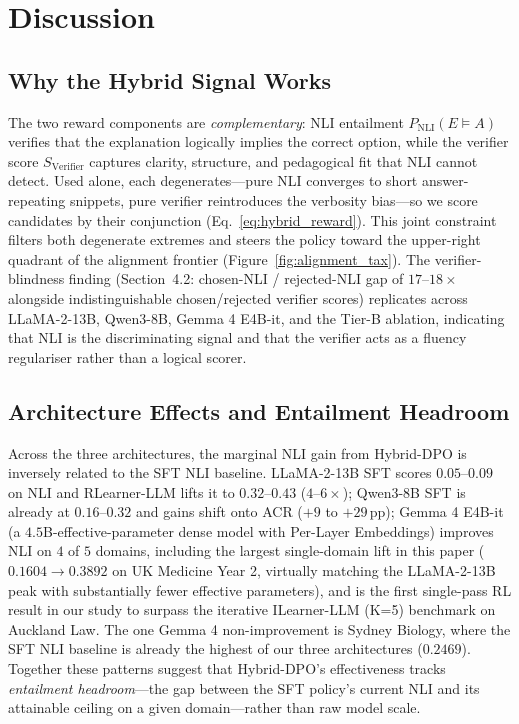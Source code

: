 \section{Discussion}

\subsection{Why the Hybrid Signal Works}
The two reward components are \emph{complementary}: NLI entailment $P_\text{NLI}(E \models A)$ verifies that the explanation logically implies the correct option, while the verifier score $S_\text{Verifier}$ captures clarity, structure, and pedagogical fit that NLI cannot detect. Used alone, each degenerates---pure NLI converges to short answer-repeating snippets, pure verifier reintroduces the verbosity bias---so we score candidates by their conjunction (Eq.~\ref{eq:hybrid_reward}). This joint constraint filters both degenerate extremes and steers the policy toward the upper-right quadrant of the alignment frontier (Figure~\ref{fig:alignment_tax}). The verifier-blindness finding (Section~4.2: chosen-NLI / rejected-NLI gap of $17$--$18\times$ alongside indistinguishable chosen/rejected verifier scores) replicates across LLaMA-2-13B, Qwen3-8B, Gemma 4 E4B-it, and the Tier-B ablation, indicating that NLI is the discriminating signal and that the verifier acts as a fluency regulariser rather than a logical scorer.

\subsection{Architecture Effects and Entailment Headroom}
\label{sec:arch-effects}
Across the three architectures, the marginal NLI gain from Hybrid-DPO is inversely related to the SFT NLI baseline. LLaMA-2-13B SFT scores $0.05$--$0.09$ on NLI and RLearner-LLM lifts it to $0.32$--$0.43$ ($4$--$6\times$); Qwen3-8B SFT is already at $0.16$--$0.32$ and gains shift onto ACR ($+9$ to $+29$\,pp); Gemma 4 E4B-it (a $4.5$B-effective-parameter dense model with Per-Layer Embeddings) improves NLI on $4$ of $5$ domains, including the largest single-domain lift in this paper ($0.1604 \to 0.3892$ on UK Medicine Year 2, virtually matching the LLaMA-2-13B peak with substantially fewer effective parameters), and is the first single-pass RL result in our study to surpass the iterative ILearner-LLM (K=5) benchmark on Auckland Law. The one Gemma 4 non-improvement is Sydney Biology, where the SFT NLI baseline is already the highest of our three architectures ($0.2469$). Together these patterns suggest that Hybrid-DPO's effectiveness tracks \emph{entailment headroom}---the gap between the SFT policy's current NLI and its attainable ceiling on a given domain---rather than raw model scale.

